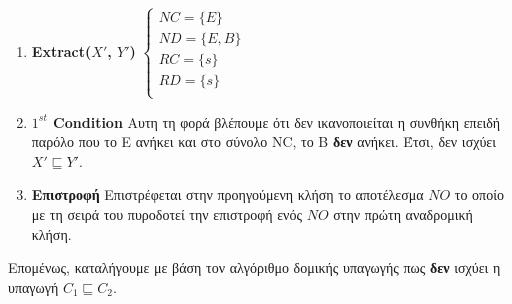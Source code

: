 \documentclass[10pt]{article}
\newcommand{\lat}{\foreignlanguage{english}}
\begin{document}
\begin{enumerate}
		\item \textbf{\lat{Extract($X'$, $Y'$)}}
		$\begin{cases}
		NC = \{E\} \\
		ND = \{E, B\} \\
		RC = \{s\} \\
		RD = \{s\} \\
		\end{cases}$

		\item \textbf{\lat{$1^{st}$ Condition}} Αυτη τη φορά βλέπουμε ότι δεν ικανοποιείται η συνθήκη επειδή παρόλο που το Ε ανήκει και στο σύνολο \lat{NC}, το Β \textbf{δεν} ανήκει. Έτσι, δεν ισχύει $X' \sqsubseteq Y'$.
		
		\item \textbf{Επιστροφή} Επιστρέφεται στην προηγούμενη κλήση το αποτέλεσμα $NO$ το οποίο με τη σειρά του πυροδοτεί την επιστροφή ενός $NO$ στην πρώτη αναδρομική κλήση. 
		
	\end{enumerate}

	Επομένως, καταλήγουμε με βάση τον αλγόριθμο δομικής υπαγωγής πως \textbf{δεν} ισχύει η υπαγωγή $C_1 \sqsubseteq C_2$.
	
\end{document}
